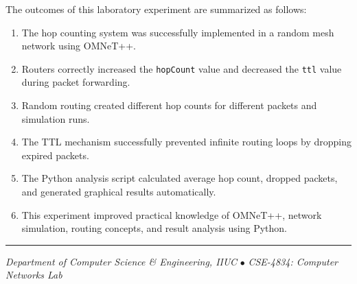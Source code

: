 \documentclass[12pt,a4paper]{article}
\begin{document}
\justifying
The outcomes of this laboratory experiment are summarized as follows:

\begin{enumerate}

\item The hop counting system was successfully implemented in a random mesh network using OMNeT++.

\item Routers correctly increased the \texttt{hopCount} value and decreased the \texttt{ttl} value during packet forwarding.

\item Random routing created different hop counts for different packets and simulation runs.

\item The TTL mechanism successfully prevented infinite routing loops by dropping expired packets.

\item The Python analysis script calculated average hop count, dropped packets, and generated graphical results automatically.

\item This experiment improved practical knowledge of OMNeT++, network simulation, routing concepts, and result analysis using Python.

\end{enumerate}

\vspace{7.0cm}
\noindent\textcolor{iiucblue}{\rule{\linewidth}{0.6pt}}
\vspace{0.3cm}
\begin{center}
{\small \textit{Department of Computer Science \& Engineering, IIUC}
\quad $\bullet$ \quad
\textit{CSE-4834: Computer Networks Lab}}
\end{center}
\end{document}
